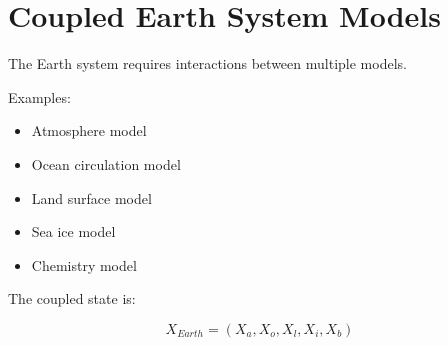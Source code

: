 \section{Coupled Earth System Models}


The Earth system requires interactions between multiple models.



Examples:


\begin{itemize}

\item Atmosphere model

\item Ocean circulation model

\item Land surface model

\item Sea ice model

\item Chemistry model

\end{itemize}



The coupled state is:


\begin{equation}
X_{Earth}
=
(X_a,X_o,X_l,X_i,X_b)
\end{equation}

